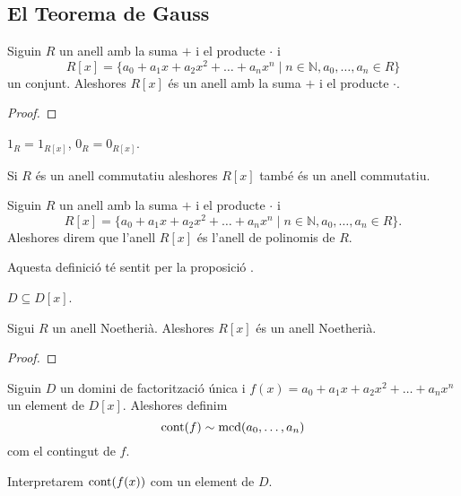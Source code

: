 \documentclass[../Apunts.tex]{subfiles}
\begin{document}
	\subsection{El Teorema de Gauss}
	\begin{proposition}
		\label{prop:l'anell de polinomis és un anell}
		Siguin \(R\) un anell amb la suma \(+\) i el producte \(\cdot\) i
		\[R[x]=\{a_{0}+a_{1}x+a_{2}x^{2}+\dots+a_{n}x^{n}\mid n\in\mathbb{N}, a_{0},\dots,a_{n}\in R\}\]
		un conjunt. Aleshores \(R[x]\) és un anell amb la suma \(+\) i el producte \(\cdot\).
		\begin{proof}
		\end{proof}
	\end{proposition}
	\begin{observation}
		\label{obs:els anells de polinomis conserven neutre i unitat}
		\(1_{R}=1_{R[x]}\), \(0_{R}=0_{R[x]}\).
	\end{observation}
	\begin{observation}
		\label{obs:els anells de polinomis conserven commutativitat}
		Si \(R\) és un anell commutatiu aleshores \(R[x]\) també és un anell commutatiu.
	\end{observation}
	\begin{definition}
		\label{def:anell de polinomis}
		Siguin \(R\) un anell amb la suma \(+\) i el producte \(\cdot\) i
		\[R[x]=\{a_{0}+a_{1}x+a_{2}x^{2}+\dots+a_{n}x^{n}\mid n\in\mathbb{N},a_{0},\dots,a_{n}\in R\}.\]
		Aleshores direm que l'anell \(R[x]\) és l'anell de polinomis de \(R\).
		
		Aquesta definició té sentit per la proposició .
	\end{definition}
	\begin{observation}
		\(D\subseteq D[x]\).
	\end{observation}
	\begin{theorem}
		Sigui \(R\) un anell Noetherià. Aleshores \(R[x]\) és un anell Noetherià.
		\begin{proof}
		\end{proof}
	\end{theorem}
	\begin{definition}
		\label{def:contingut d'un polinomi}
		Siguin \(D\) un domini de factorització única i \(f(x)=a_{0}+a_{1}x+a_{2}x^{2}+\dots+a_{n}x^{n}\) un element de \(D[x]\). Aleshores definim
		\[\operatorname{cont}(f)\sim\operatorname{mcd}(a_{0},\dots,a_{n})\]
		com el contingut de \(f\). %
		
		Interpretarem \(\operatorname{cont}(f(x))\) com un element de \(D\).
	\end{definition}
\end{document}
